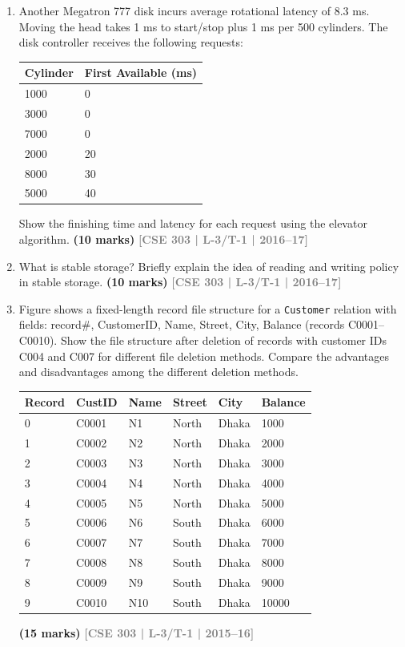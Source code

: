 \documentclass[12pt]{article}
\newcommand{\yr}[1]{\hfill\textcolor{gray}{\small\textbf{[#1]}}}
\newcommand{\mk}[1]{\textcolor{orange!70!black}{\small\textbf{(#1 marks)}}}
\begin{document}
\begin{enumerate}
\item Another Megatron 777 disk incurs average rotational latency of 8.3 ms. Moving the head takes 1 ms to start/stop plus 1 ms per 500 cylinders. The disk controller receives the following requests:
\medskip
\begin{center}
\begin{tabular}{ll}
\toprule
\textbf{Cylinder} & \textbf{First Available (ms)}\\
\midrule
1000 & 0\\
3000 & 0\\
7000 & 0\\
2000 & 20\\
8000 & 30\\
5000 & 40\\
\bottomrule
\end{tabular}
\end{center}
Show the finishing time and latency for each request using the elevator algorithm.
\mk{10} \yr{CSE 303 | L-3/T-1 | 2016--17}


\item What is stable storage? Briefly explain the idea of reading and writing policy in stable storage.
\mk{10} \yr{CSE 303 | L-3/T-1 | 2016--17}




\item Figure shows a fixed-length record file structure for a \texttt{Customer} relation with fields: record\#, CustomerID, Name, Street, City, Balance (records C0001--C0010). Show the file structure after deletion of records with customer IDs C004 and C007 for different file deletion methods. Compare the advantages and disadvantages among the different deletion methods.
\medskip
\begin{center}
\small
\begin{tabular}{llllll}
\toprule
\textbf{Record} & \textbf{CustID} & \textbf{Name} & \textbf{Street} & \textbf{City} & \textbf{Balance}\\
\midrule
0 & C0001 & N1 & North & Dhaka & 1000\\
1 & C0002 & N2 & North & Dhaka & 2000\\
2 & C0003 & N3 & North & Dhaka & 3000\\
3 & C0004 & N4 & North & Dhaka & 4000\\
4 & C0005 & N5 & North & Dhaka & 5000\\
5 & C0006 & N6 & South & Dhaka & 6000\\
6 & C0007 & N7 & South & Dhaka & 7000\\
7 & C0008 & N8 & South & Dhaka & 8000\\
8 & C0009 & N9 & South & Dhaka & 9000\\
9 & C0010 & N10 & South & Dhaka & 10000\\
\bottomrule
\end{tabular}
\end{center}
\mk{15} \yr{CSE 303 | L-3/T-1 | 2015--16}



\end{enumerate}
\end{document}
